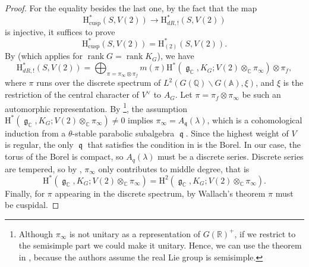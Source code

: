 \documentclass[11pt, a4paper]{amsart}
\theoremstyle{plain}
\theoremstyle{definition}
\numberwithin{equation}{section}
\def\AAA{\mathbb{A}}
\def\CC{\mathbb{C}}
\def\QQ{\mathbb{Q}}
\def\RR{\mathbb{R}}
\DeclareMathOperator{\rank}{rank}
\DeclareMathOperator{\lieg}{\mathfrak g}
\DeclareMathOperator{\lieq}{\mathfrak q}
\begin{document}
\begin{proof}
    For the equality besides the last one, by the fact that the map 
    \begin{equation*}
         \mathrm{H}^{*}_{\text{cusp}}(S, V(2)) \rightarrow \mathrm{H}^{*}_{dR, !}(S, V(2))
    \end{equation*}
    is injective, it suffices to prove 
    \begin{equation*}
        \mathrm{H}^{*}_{\text{cusp}}(S, V(2)) = \mathrm{H}^{*}_{(2)}(S, V(2)). 
    \end{equation*}
     By \cite[Theorem 4]{Borel_Bull80} (which applies for $\rank G = \rank K_{G}$), we have 
     \begin{equation*}
         \mathrm{H}^{*}_{dR, !}(S, V(2)) = \bigoplus_{\pi = \pi_{\infty} \otimes \pi_f} m(\pi) \mathrm{H}^{*}(\lieg_{\CC}, K_{G}; V(2) \otimes_{\CC} \pi_{\infty})\otimes \pi_f, 
     \end{equation*}
     where $\pi$ runs over the discrete spectrum of $L^{2}(G(\QQ) \backslash G(\AAA), \xi)$, and $\xi$ is the restriction of the central character of $V^{\vee}$ to $A_{G}$.
     Let $\pi = \pi_f \otimes \pi_{\infty}$ be such an automorphic representation. By \cite[Theorem 5.6]{VZ84}\footnote{Although $\pi_{\infty}$ is not unitary as a representation of $G(\RR)^{+}$, if 
     we restrict to the semisimple part we could make it unitary. Hence, we can use the theorem in \cite{VZ84}, because the authors assume the real Lie group is semisimple.},
     the assumption $\mathrm{H}^{*}(\lieg_{\CC}, K_{G}; V(2) \otimes_{\CC} \pi_{\infty}) \neq 0$ implies $\pi_{\infty} = A_{\lieq}(\lambda)$, which is a cohomological induction from a $\theta$-stable parabolic subalgebra $\lieq$. Since the highest weight of $V$ is regular, the only $\lieq$ that satisfies the condition in \cite[Theorem 5.6]{VZ84} is the Borel. In our case, the torus of the Borel is compact, so $A_{q}(\lambda)$ must be a discrete series. Discrete series are tempered, so by \cite[III, Corollary 5.2]{Borel_Wallach}, $\pi_{\infty}$ only contributes to middle degree, that is 
     \begin{equation*}
         \mathrm{H}^{*}(\lieg_{\CC}, K_{G}; V(2) \otimes_{\CC} \pi_{\infty}) = \mathrm{H}^{2}(\lieg_{\CC}, K_{G}; V(2) \otimes_{\CC} \pi_{\infty}). 
     \end{equation*}
     Finally, for $\pi$ appearing in the discrete spectrum, by Wallach's theorem \cite[Theorem 4.3]{Wallach84} $\pi$ must be cuspidal. 
\end{proof}
\end{document}
